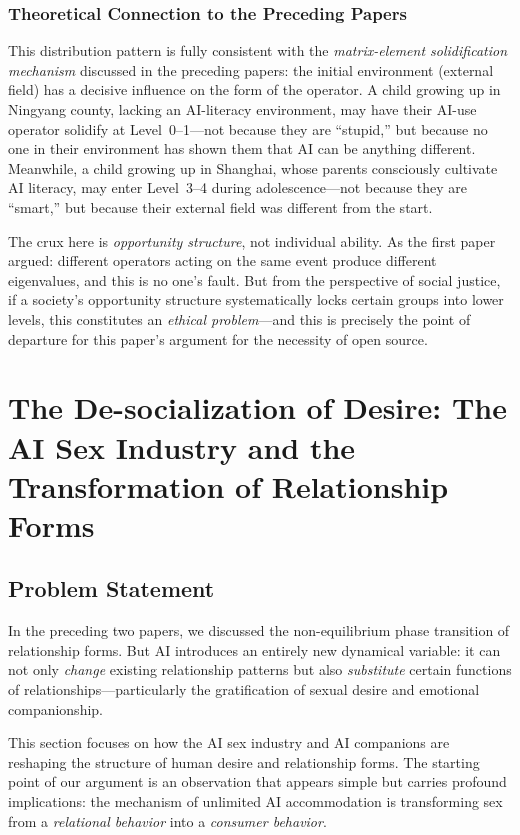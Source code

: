 ﻿\documentclass[12pt,a4paper]{article}
\begin{document}
\subsubsection{Theoretical Connection to the Preceding Papers}

This distribution pattern is fully consistent with the \textit{matrix-element solidification mechanism} discussed in the preceding papers: the initial environment (external field) has a decisive influence on the form of the operator. A child growing up in Ningyang county, lacking an AI-literacy environment, may have their AI-use operator solidify at Level~0--1---not because they are ``stupid,'' but because no one in their environment has shown them that AI can be anything different. Meanwhile, a child growing up in Shanghai, whose parents consciously cultivate AI literacy, may enter Level~3--4 during adolescence---not because they are ``smart,'' but because their external field was different from the start.

The crux here is \textit{opportunity structure}, not individual ability. As the first paper argued: different operators acting on the same event produce different eigenvalues, and this is no one's fault. But from the perspective of social justice, if a society's opportunity structure systematically locks certain groups into lower levels, this constitutes an \textit{ethical problem}---and this is precisely the point of departure for this paper's argument for the necessity of open source.

\section{The De-socialization of Desire: The AI Sex Industry and the Transformation of Relationship Forms}

\subsection{Problem Statement}

In the preceding two papers, we discussed the non-equilibrium phase transition of relationship forms. But AI introduces an entirely new dynamical variable: it can not only \textit{change} existing relationship patterns but also \textit{substitute} certain functions of relationships---particularly the gratification of sexual desire and emotional companionship.

This section focuses on how the AI sex industry and AI companions are reshaping the structure of human desire and relationship forms. The starting point of our argument is an observation that appears simple but carries profound implications: the mechanism of unlimited AI accommodation is transforming sex from a \textit{relational behavior} into a \textit{consumer behavior}.
\end{document}
